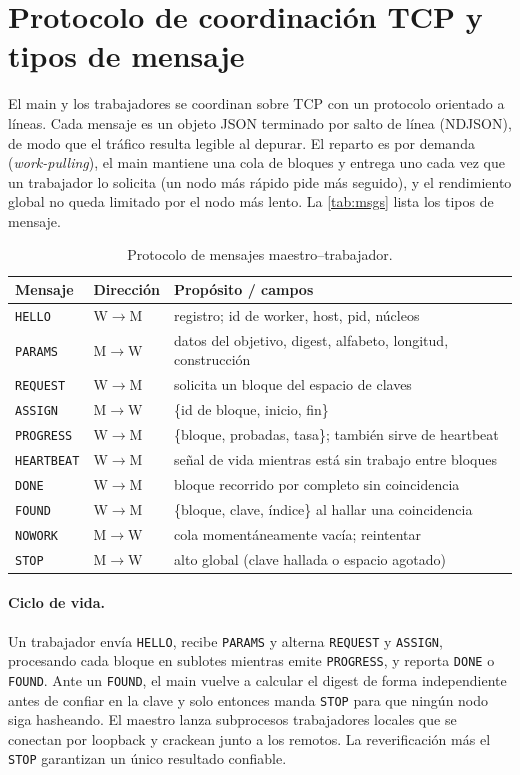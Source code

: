 \section{Protocolo de coordinación TCP y tipos de mensaje}\label{sec:protocol}
El main y los trabajadores se coordinan sobre TCP  con un protocolo orientado a líneas. Cada mensaje es un objeto JSON terminado por salto de línea (NDJSON), de modo que el tráfico resulta legible al depurar. El reparto es por demanda (\emph{work-pulling}), el main mantiene una cola de bloques y entrega uno cada vez que un trabajador lo solicita (un nodo más rápido pide más seguido), y el rendimiento global no queda limitado por el nodo más lento. La \autoref{tab:msgs} lista los tipos de mensaje.

\begin{table}[H]
\centering
\footnotesize
\begin{tabularx}{\linewidth}{l l X}
\hline
\textbf{Mensaje} & \textbf{Dirección} & \textbf{Propósito / campos}\\
\hline
\texttt{HELLO}     & W$\rightarrow$M & registro; id de worker, host, pid, núcleos\\
\texttt{PARAMS}    & M$\rightarrow$W & datos del objetivo, digest, alfabeto, longitud, construcción\\
\texttt{REQUEST}   & W$\rightarrow$M & solicita un bloque del espacio de claves\\
\texttt{ASSIGN}    & M$\rightarrow$W & \{id de bloque, inicio, fin\}\\
\texttt{PROGRESS}  & W$\rightarrow$M & \{bloque, probadas, tasa\}; también sirve de heartbeat\\
\texttt{HEARTBEAT} & W$\rightarrow$M & señal de vida mientras está sin trabajo entre bloques\\
\texttt{DONE}      & W$\rightarrow$M & bloque recorrido por completo sin coincidencia\\
\texttt{FOUND}     & W$\rightarrow$M & \{bloque, clave, índice\} al hallar una coincidencia\\
\texttt{NOWORK}    & M$\rightarrow$W & cola momentáneamente vacía; reintentar\\
\texttt{STOP}      & M$\rightarrow$W & alto global (clave hallada o espacio agotado)\\
\hline
\end{tabularx}
\caption{Protocolo de mensajes maestro--trabajador.}
\label{tab:msgs}
\end{table}

\paragraph{Ciclo de vida.} Un trabajador envía \texttt{HELLO}, recibe \texttt{PARAMS} y alterna \texttt{REQUEST} y \texttt{ASSIGN}, procesando cada bloque en sublotes mientras emite \texttt{PROGRESS}, y reporta \texttt{DONE} o \texttt{FOUND}. Ante un \texttt{FOUND}, el main vuelve a calcular el digest de forma independiente antes de confiar en la clave y solo entonces manda \texttt{STOP} para que ningún nodo siga hasheando. El maestro lanza subprocesos trabajadores locales que se conectan por loopback y crackean junto a los remotos. La reverificación más el \texttt{STOP} garantizan un único resultado confiable.
